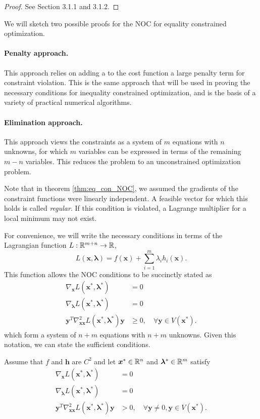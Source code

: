 \begin{proof}
See \cite{bertsekas2016nonlinear} Section 3.1.1 and 3.1.2.
\end{proof}

We will sketch two possible proofs for the NOC for equality constrained optimization. 

\paragraph{Penalty approach.} This approach relies on adding a to the cost function a large penalty term for constraint violation. This is the same approach that will be used in proving the necessary conditions for inequality constrained optimization, and is the basis of a variety of practical numerical algorithms. 

\paragraph{Elimination approach.} This approach views the constraints as a system of $m$ equations with $n$ unknowns, for which $m$ variables can be expressed in terms of the remaining $m-n$ variables. This reduces the problem to an unconstrained optimization problem. 

Note that in theorem \ref{thm:eq_con_NOC}, we assumed the gradients of the constraint functions were linearly independent. A feasible vector for which this holds is called \textit{regular}. If this condition is violated, a Lagrange multiplier for a local minimum may not exist. 

For convenience, we will write the necessary conditions in terms of the Lagrangian function $L:\mathbb{R}^{m+n} \to \mathbb{R}$,
\begin{equation}
    L(\bm{x},\bm{\lambda}) = f(\bm{x}) + \sum^m_{i=1} \lambda_i h_i(\bm{x}).
\end{equation}
This function allows the NOC conditions to be succinctly stated as 
\begin{align}
    \nabla_{\bm{x}} L(\bm{x}^*,\bm{\lambda}^*) &= 0\\
    \nabla_{\bm{\lambda}} L(\bm{x}^*,\bm{\lambda}^*) &= 0\\
    \bm{y}^T \nabla^2_{\bm{xx}} L(\bm{x}^*,\bm{\lambda}^*) \bm{y} &\geq 0, \quad \forall \bm{y} \in V(\bm{x}^*).
\end{align}
which form a system of $n+m$ equations with $n+m$ unknowns. Given this notation, we can state the sufficient conditions. 

\begin{theorem}
Assume that $f$ and $\bm{h}$ are $C^2$ and let $\bm{x}^* \in \mathbb{R}^n$ and $\bm{\lambda}^* \in \mathbb{R}^m$ satisfy
\begin{align}
    \nabla_{\bm{x}} L(\bm{x}^*,\bm{\lambda}^*) &= 0\\
    \nabla_{\bm{\lambda}} L(\bm{x}^*,\bm{\lambda}^*) &= 0\\
    \bm{y}^T \nabla^2_{\bm{xx}} L(\bm{x}^*,\bm{\lambda}^*) \bm{y} &> 0, \quad \forall \bm{y} \neq 0, \bm{y} \in V(\bm{x}^*).
\end{align}
\end{theorem}


